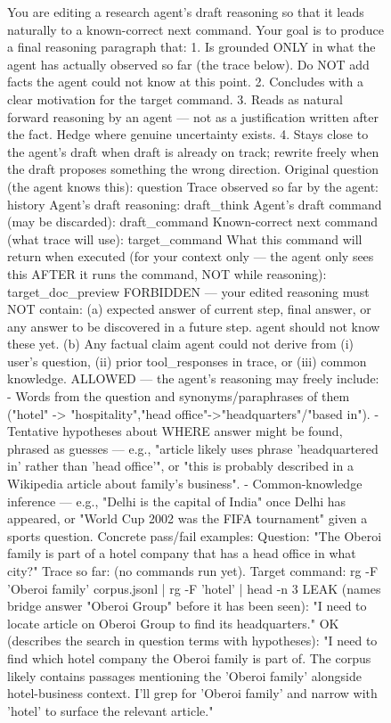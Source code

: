 \documentclass{article} %
\begin{document}
\begin{figure}[!t]
\begin{promptbox}
You are editing a research agent's draft reasoning so that it leads naturally to a known-correct next command. Your goal is to produce a final reasoning paragraph that: 1. Is grounded ONLY in what the agent has actually observed so far (the trace below). Do NOT add facts the agent could not know at this point. 2. Concludes with a clear motivation for the target command. 3. Reads as natural forward reasoning by an agent — not as a justification written after the fact. Hedge where genuine uncertainty exists. 4. Stays close to the agent's draft when draft is already on track; rewrite freely when the draft proposes something the wrong direction.
Original question (the agent knows this): {question}
Trace observed so far by the agent: {history}
Agent's draft reasoning: {draft_think}
Agent's draft command (may be discarded): {draft_command}
Known-correct next command (what trace will use): {target_command}
What this command will return when executed (for your context only — the agent only sees this AFTER it runs the command, NOT while reasoning): {target_doc_preview}
FORBIDDEN — your edited reasoning must NOT contain: (a) expected answer of current step, final answer, or any answer to be discovered in a future step. agent should not know these yet. (b) Any factual claim agent could not derive from (i) user's question, (ii) prior tool_responses in trace, or (iii) common knowledge.
ALLOWED — the agent's reasoning may freely include: - Words from the question and synonyms/paraphrases of them ("hotel" -> "hospitality","head office"->"headquarters"/"based in"). - Tentative hypotheses about WHERE answer might be found, phrased as guesses — e.g., "article likely uses phrase 'headquartered in' rather than 'head office'", or "this is probably described in a Wikipedia article about family's business". - Common-knowledge inference — e.g., "Delhi is the capital of India" once Delhi has appeared, or "World Cup 2002 was the FIFA tournament" given a sports question.
Concrete pass/fail examples: Question: "The Oberoi family is part of a hotel company that has a head office in what city?" Trace so far: (no commands run yet). Target command: rg -F 'Oberoi family' corpus.jsonl | rg -F 'hotel' | head -n 3
LEAK (names bridge answer "Oberoi Group" before it has been seen): "I need to locate article on Oberoi Group to find its headquarters."
OK (describes the search in question terms with hypotheses): "I need to find which hotel company the Oberoi family is part of. The corpus likely contains passages mentioning the 'Oberoi family' alongside hotel-business context. I'll grep for 'Oberoi family' and narrow with 'hotel' to surface the relevant article."

\end{promptbox}
\end{figure}
\end{document}
